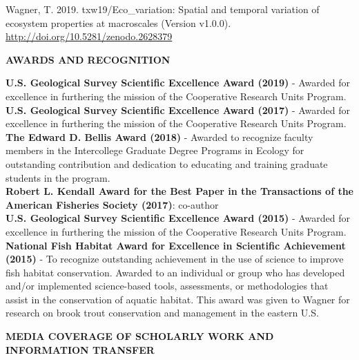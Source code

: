 \documentclass[10pt]{article}
\begin{document}
\begin{flushleft}
\begin{etaremune}
\item Wagner, T. 2019. txw19/Eco\_variation: Spatial and temporal variation of ecosystem properties at macroscales (Version v1.0.0). \url{http://doi.org/10.5281/zenodo.2628379}
\end{etaremune}	

\centerline {\bf{AWARDS AND RECOGNITION}}

\vspace{5pt}
{\bf U.S. Geological Survey Scientific Excellence Award (2019)} - Awarded for excellence in furthering the mission of the Cooperative Research Units Program.\\
\vspace{5pt}
{\bf U.S. Geological Survey Scientific Excellence Award (2017)} - Awarded for excellence in furthering the mission of the Cooperative Research Units Program.\\
\vspace{5pt}
{\bf The Edward D. Bellis Award (2018)} - Awarded to recognize faculty members in the Intercollege Graduate Degree Programs in Ecology for outstanding contribution and dedication to educating and training graduate students in the program.\\
\vspace{5pt}
\textbf{Robert L. Kendall Award for the Best Paper in the Transactions of the American Fisheries Society (2017)}: co-author\\
\vspace{5pt}
{\bf U.S. Geological Survey Scientific Excellence Award (2015)} - Awarded for excellence in furthering the mission of the Cooperative Research Units Program.\\
\vspace{5pt}
{\bf National Fish Habitat Award for Excellence in Scientific Achievement  (2015)} - To recognize outstanding achievement in the use of science to improve fish habitat conservation. Awarded to an individual or group who has developed and/or implemented science-based tools, assessments, or methodologies that assist in the conservation of aquatic habitat. This award was given to Wagner for research on brook trout conservation and management in the eastern U.S.\\

\vspace{5pt}
\vspace{6pt}
\centerline {\bf{MEDIA COVERAGE OF SCHOLARLY WORK AND INFORMATION TRANSFER}}
\vspace{5pt}


\end{flushleft}
\end{document}

